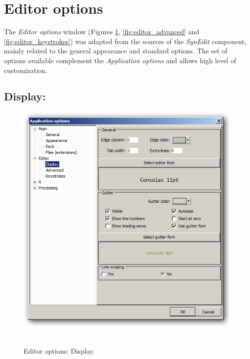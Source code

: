 
\hypertarget{working_editor}{}
\section{Editor options}

The \textit{Editor options} window
(Figures \ref{fig:editor_display}, \ref{fig:editor_advanced} and \ref{fig:editor_keystrokes})
was adapted from the sources of the
\textit{SynEdit} component, mainly related to the general appearance and
standard options. The set of options available complement the
\textit{Application options} and allows high level of customization.


\hypertarget{working_editor_display}{}
\subsection{Display:}

\begin{figure}[h!]
  \includegraphics[scale=0.50]{./res/app_editor_display.png}~~
  \caption{Editor options: Display.}
  \label{fig:editor_display}
\end{figure}

